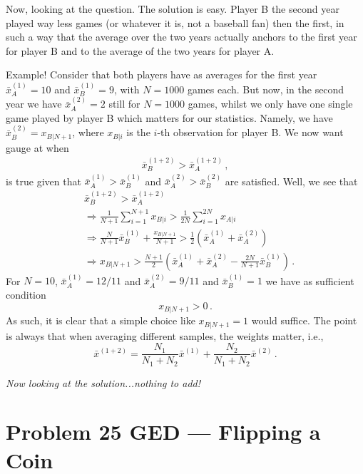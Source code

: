 \documentclass{article}
\begin{document}
Now, looking at the question. The solution is easy. Player B the second year played way less games (or whatever it is, not a baseball fan) then the first, in such a way that the average over the two years actually anchors to the first year for player B and to the average of the two years for player A.

Example! Consider that both players have as averages for the first year $\bar{x}_A^{(1)} = 10$ and $\bar{x}_B^{(1)} = 9$, with $N =1000$ games each. But now, in the second year we have $\bar{x}_A^{(2)} = 2$ still for $N = 1000$ games, whilst we only have one single game played by player B which matters for our statistics. Namely, we have $\bar{x}_B^{(2)} = x_{B|N+1}$, where $x_{B|i}$ is the $i$-th observation for player B. We now want gauge at when 
\begin{align*}
     \bar{x}_B^{(1+2)} > \bar{x}_A^{(1+2)} \, ,
\end{align*}
is true given that $\bar{x}_A^{(1)} > \bar{x}_B^{(1)} $ and $\bar{x}_A^{(2)} > \bar{x}_B^{(2)} $ are satisfied. Well, we see that 
\begin{align*}
     &\bar{x}_B^{(1+2)} > \bar{x}_A^{(1+2)} \, \\ 
     &\Rightarrow  \frac{1}{N+1}\sum_{i=1}^{N+1}x_{B|i} > \frac{1}{2N}\sum_{i=1}^{2N}x_{A|i}\\
     &\Rightarrow  \frac{N}{N+1}\bar{x}_{B}^{(1)}+ \frac{x_{B|N+1}}{N+1}> \frac{1}{2}\left(\bar{x}_{A}^{(1)}+\bar{x}_{A}^{(2)}\right)\\
      &\Rightarrow  {x_{B|N+1}}> \frac{N+1}{2}\left(\bar{x}_{A}^{(1)}+\bar{x}_{A}^{(2)} -\frac{2N}{N+1}\bar{x}_{B}^{(1)} \right) \, .
\end{align*}
For $N = 10$,  $\bar{x}_A^{(1)} = 12/11$ and $\bar{x}_A^{(2)} = 9/11$ and $\bar{x}_B^{(1)} = 1$ we have as sufficient condition
\begin{equation*}
     {x_{B|N+1}}> 0 \, .
\end{equation*}
As such, it is clear that a simple choice like $x_{B|N+1} = 1$ would suffice. The point is always that when averaging different samples, the weights matter, i.e.,
\begin{equation*}
    \bar{x}^{(1+2)} = \frac{N_1}{N_1+N_2}\bar{x}^{(1)} + \frac{N_2}{N_1+N_2}\bar{x}^{(2)} \, .
\end{equation*}

\textit{Now looking at the solution...nothing to add!}

\section{Problem 25 GED --- Flipping a Coin}
\end{document}
